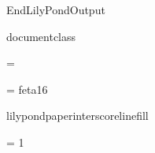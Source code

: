 %
%
%
\edef\lilyponddefsELC{\the\endlinechar}%
\relax

\def\ifundefined#1{
  \expandafter\ifx\csname#1\endcsname\relax
}


\ifx\mustmakelilypondtitle\undefined
\else
  \makelilypondtitle
\fi

\ifx\mustmakelilypondpiecetitle\undefined
\else
  \makelilypondpiecetitle
\fi


\def\SkipLilydefs{
  \endlinechar \lilyponddefsELC
  \endinput}
\ifundefined{EndLilyPondOutput}
  \def\EndLilyPondOutput{\csname bye\endcsname}
  \def\SkipLilydefs{}
\fi
\SkipLilydefs


\ifundefined{documentclass}
  

  \hsize=\lilypondpaperlinewidth\lilypondpaperunit
\else
  
\fi



\font\fetasixteen = feta16
\def\fetafont{\fetasixteen}
\def\fetachar#1{\hbox{\fetasixteen#1}}

\def\botalign#1{
  \vbox to 0pt{\vss #1}
}
\def\leftalign#1{
  \hbox to 0pt{#1\hss}
}


%
%

\def\myfilbreak{}%


\ifundefined{lilypondpaperinterscorelinefill}
  \def\lilypondpaperinterscorelinefill{0}
\else
  \def\lilypondpaperinterscorelinefill{1}
\fi

\def\interscoreline{
  \vskip \lilypondpaperinterscoreline \lilypondpaperunit
    plus \lilypondpaperinterscorelinefill fill
}

\def\placebox#1#2#3{
  \botalign{
    \hbox{\raise #1\leftalign{\kern #2{}#3}}
  }
}

\ifx\pdfoutput\undefined  
  
\else
  \ifx\pdfoutput\relax
    
  \else
    \pdfoutput = 1
    
  \fi
\fi

